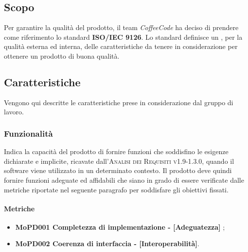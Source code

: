 \documentclass[../piano-di-qualifica.tex]{subfiles}
\begin{document}
\subsection{Scopo}%
\label{sec:scopo}
Per garantire la qualità del prodotto, il team \emph{CoffeeCode} ha deciso di prendere come riferimento lo standard \textbf{ISO/IEC 9126}.
Lo standard definisce un , per la qualità esterna ed interna, delle caratteristiche da tenere in considerazione per ottenere un prodotto di buona qualità.

\subsection{Caratteristiche}%
\label{sub:caratteristiche}
Vengono qui descritte le caratteristiche prese in considerazione dal gruppo di lavoro.

\subsubsection{Funzionalità}%
\label{sub:funzionalita}
Indica la capacità del prodotto di fornire funzioni che soddisfino le esigenze dichiarate e implicite, ricavate dall'\textsc{Analisi dei Requisiti v1.9-1.3.0}, quando il software viene utilizzato in un determinato contesto.
Il prodotto deve quindi fornire funzioni adeguate ed affidabili che siano in grado di essere verificate dalle metriche riportate nel seguente paragrafo per soddisfare gli obiettivi fissati.

\paragraph{Metriche}
\label{sub:metriche}
\begin{itemize}
    \item \textbf{MoPD001 Completezza di implementazione - [Adeguatezza]} ;
    \item \textbf{MoPD002 Coerenza di interfaccia - [Interoperabilità]}.
\end{itemize}
\end{document}
